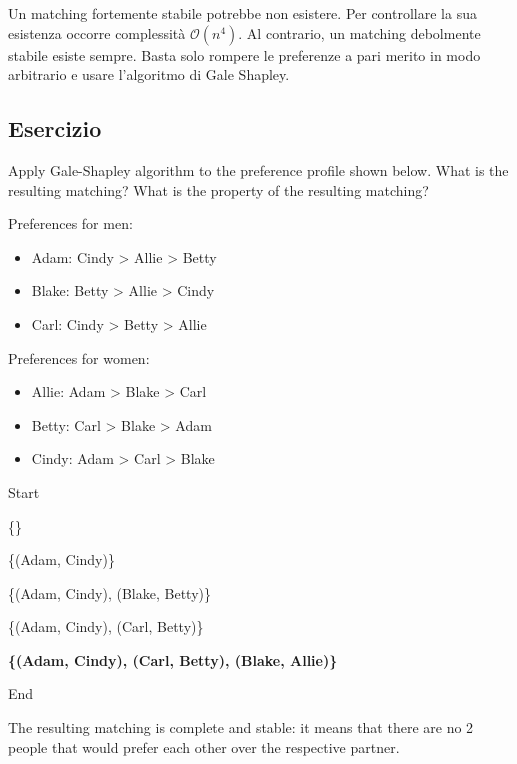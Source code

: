 Un matching fortemente stabile potrebbe non esistere. Per controllare la
sua esistenza occorre complessità $\mathcal{O}(n^4)$. Al contrario, un
matching debolmente stabile esiste sempre. Basta solo rompere le preferenze
a pari merito in modo arbitrario e usare l'algoritmo di Gale Shapley.

\subsection{Esercizio}

Apply Gale-Shapley algorithm to the preference profile shown below.
What is the resulting matching?
What is the property of the resulting matching?

Preferences for men:

\begin{itemize}
 \item Adam: Cindy > Allie > Betty
 \item Blake: Betty > Allie > Cindy
 \item Carl: Cindy > Betty > Allie
\end{itemize}

Preferences for women:

\begin{itemize}
 \item Allie: Adam > Blake > Carl
 \item Betty: Carl > Blake > Adam
 \item Cindy: Adam > Carl > Blake
\end{itemize}

Start

\{\}

\{(Adam, Cindy)\}

\{(Adam, Cindy), (Blake, Betty)\}

\{(Adam, Cindy), (Carl, Betty)\}

\textbf{\{(Adam, Cindy), (Carl, Betty), (Blake, Allie)\}}

End

The resulting matching is complete and stable: it means that there are no 2
people that would prefer each other over the respective partner.



